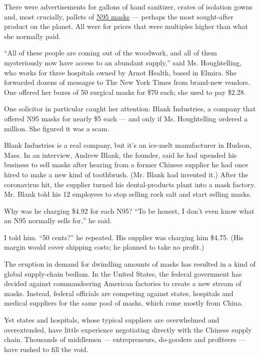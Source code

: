There were advertisements for gallons of hand sanitizer, crates of
isolation gowns and, most crucially, pallets of
\href{https://www.nytimes3xbfgragh.onion/2020/05/07/health/masks-banned-n95-coronavirus.html}{N95
masks} --- perhaps the most sought-after product on the planet. All were
for prices that were multiples higher than what she normally paid.

``All of these people are coming out of the woodwork, and all of them
mysteriously now have access to an abundant supply,'' said Ms.
Houghtelling, who works for three hospitals owned by Arnot Health, based
in Elmira. She forwarded dozens of messages to The New York Times from
brand-new vendors. One offered her boxes of 50 surgical masks for \$70
each; she used to pay \$2.28.

One solicitor in particular caught her attention: Blank Industries, a
company that offered N95 masks for nearly \$5 each --- and only if Ms.
Houghtelling ordered a million. She figured it was a scam.

Blank Industries is a real company, but it's an ice-melt manufacturer in
Hudson, Mass. In an interview, Andrew Blank, the founder, said he had
upended his business to sell masks after hearing from a former Chinese
supplier he had once hired to make a new kind of toothbrush. (Mr. Blank
had invented it.) After the coronavirus hit, the supplier turned his
dental-products plant into a mask factory. Mr. Blank told his 12
employees to stop selling rock salt and start selling masks.

Why was he charging \$4.92 for each N95? ``To be honest, I don't even
know what an N95 normally sells for,'' he said.

I told him. ``50 cents?'' he repeated. His supplier was charging him
\$4.75. (His margin would cover shipping costs; he planned to take no
profit.)

The eruption in demand for dwindling amounts of masks has resulted in a
kind of global supply-chain bedlam. In the United States, the federal
government has decided against commandeering American factories to
create a new stream of masks. Instead, federal officials are competing
against states, hospitals and medical suppliers for the same pool of
masks, which come mostly from China.

Yet states and hospitals, whose typical suppliers are overwhelmed and
overextended, have little experience negotiating directly with the
Chinese supply chain. Thousands of middlemen --- entrepreneurs,
do-gooders and profiteers --- have rushed to fill the void.

